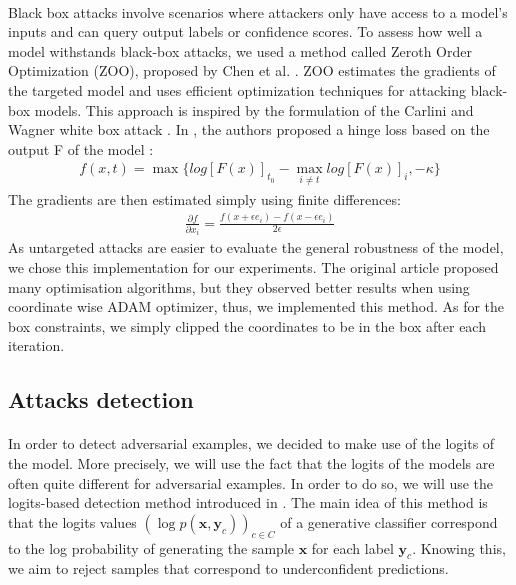 \documentclass[10pt,twocolumn,letterpaper]{article}
\begin{document}
\paragraph{}

Black box attacks involve scenarios where attackers only have access to a model's inputs and can query output labels or confidence scores. To assess how well a model withstands black-box attacks, we used a method called Zeroth Order Optimization (ZOO), proposed by Chen et al. \cite{Chen_2017}. ZOO estimates the gradients of the targeted model and uses efficient optimization techniques for attacking black-box models.
This approach is inspired by the formulation of the Carlini and Wagner white box attack \cite{robustness}.
In \cite{Chen_2017}, the authors proposed a hinge loss based on the output F of the model :
\begin{align*}
    f(x,t) = \max \{log[F(x)]_{t_0} - \max_{i \neq t}log[F(x)]_i, -\kappa \}
\end{align*}
The gradients are then estimated simply using finite differences:
\begin{align*}
    \frac{\partial f}{\partial x_i} = \frac{f(x + \epsilon e_i) - f(x - \epsilon e_i)}{2 \epsilon}
\end{align*}
As untargeted attacks are easier to evaluate the general robustness of the model, we chose this implementation for our experiments. The original article proposed many optimisation algorithms, but they observed better results when using coordinate wise ADAM optimizer, thus, we implemented this method. As for the box constraints, we simply clipped the coordinates to be in the box after each iteration.

\subsection{Attacks detection}

\paragraph{} In order to detect adversarial examples, we decided to make use of the logits of the model. More precisely, we will use the fact that the logits of the models are often quite different for adversarial examples. In order to do so, we will use the logits-based detection method introduced in \cite{main_paper}. The main idea of this method is that the logits values $(\log{p(\bm{x}, \bm{y}_c)})_{c \in C}$ of a generative classifier correspond to the log probability of generating the sample $\bm{x}$ for each label $\bm{y}_c$. Knowing this, we aim to reject samples that correspond to underconfident predictions. 
\end{document}
